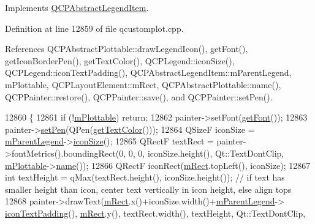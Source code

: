 Implements \hyperlink{class_q_c_p_abstract_legend_item_a97dedc084c672359710f16b31d046d1d}{Q\+C\+P\+Abstract\+Legend\+Item}.



Definition at line 12859 of file qcustomplot.\+cpp.



References Q\+C\+P\+Abstract\+Plottable\+::draw\+Legend\+Icon(), get\+Font(), get\+Icon\+Border\+Pen(), get\+Text\+Color(), Q\+C\+P\+Legend\+::icon\+Size(), Q\+C\+P\+Legend\+::icon\+Text\+Padding(), Q\+C\+P\+Abstract\+Legend\+Item\+::m\+Parent\+Legend, m\+Plottable, Q\+C\+P\+Layout\+Element\+::m\+Rect, Q\+C\+P\+Abstract\+Plottable\+::name(), Q\+C\+P\+Painter\+::restore(), Q\+C\+P\+Painter\+::save(), and Q\+C\+P\+Painter\+::set\+Pen().


\begin{DoxyCode}
12860 \{
12861   \textcolor{keywordflow}{if} (!\hyperlink{class_q_c_p_plottable_legend_item_ada647fb4b22971a1a424e15b4f6af0d9}{mPlottable}) \textcolor{keywordflow}{return};
12862   painter->setFont(\hyperlink{class_q_c_p_plottable_legend_item_a8a85c8a25affb4895423d730164d61de}{getFont}());
12863   painter->\hyperlink{class_q_c_p_painter_af9c7a4cd1791403901f8c5b82a150195}{setPen}(QPen(\hyperlink{class_q_c_p_plottable_legend_item_ad762b07439c738660ba93e78c1d03667}{getTextColor}()));
12864   QSizeF iconSize = \hyperlink{class_q_c_p_abstract_legend_item_aafcd9fc6fcb10f4a8d46037011afafe8}{mParentLegend}->\hyperlink{class_q_c_p_legend_a27dfb770b14adc0e8811bef8129780a5}{iconSize}();
12865   QRectF textRect = painter->fontMetrics().boundingRect(0, 0, 0, iconSize.height(), Qt::TextDontClip, 
      \hyperlink{class_q_c_p_plottable_legend_item_ada647fb4b22971a1a424e15b4f6af0d9}{mPlottable}->\hyperlink{class_q_c_p_abstract_plottable_a1affc1972938e4364a9325e4e4e4dcea}{name}());
12866   QRectF iconRect(\hyperlink{class_q_c_p_layout_element_ad8896f05550389f7b9e92c9e6cdf6e01}{mRect}.topLeft(), iconSize);
12867   \textcolor{keywordtype}{int} textHeight = qMax(textRect.height(), iconSize.height());  \textcolor{comment}{// if text has smaller height than icon,
       center text vertically in icon height, else align tops}
12868   painter->drawText(\hyperlink{class_q_c_p_layout_element_ad8896f05550389f7b9e92c9e6cdf6e01}{mRect}.x()+iconSize.width()+\hyperlink{class_q_c_p_abstract_legend_item_aafcd9fc6fcb10f4a8d46037011afafe8}{mParentLegend}->
      \hyperlink{class_q_c_p_legend_a9d6d07042a284c4ba5f9e3cb5c9281ef}{iconTextPadding}(), \hyperlink{class_q_c_p_layout_element_ad8896f05550389f7b9e92c9e6cdf6e01}{mRect}.y(), textRect.width(), textHeight, Qt::TextDontClip, 

\end{DoxyCode}
